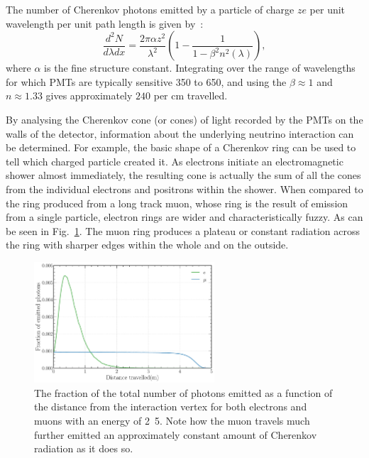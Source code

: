 The number of Cherenkov photons emitted by a particle of charge $ze$ per unit wavelength per unit
path length is given by~\cite{particle2020}:
\begin{equation}
    \frac{d^{2}N}{d\lambda dx}=\frac{2\pi\alpha z^{2}}{\lambda^{2}}
    \left(1-\frac{1}{1-\beta^{2}n^{2}(\lambda)}\right),
    \label{eq:cherenkov_emission}
\end{equation}
where $\alpha$ is the fine structure constant. Integrating over the range of wavelengths for which
PMTs are typically sensitive \unit{350}{} to \unit{650}{}, and using the
$\beta\approx 1$ and $n\approx1.33$ gives approximately $240$ per cm travelled.

By analysing the Cherenkov cone (or cones) of light recorded by the PMTs on the walls of the
detector, information about the underlying neutrino interaction can be determined. For example,
the basic shape of a Cherenkov ring can be used to tell which charged particle created it. As
electrons initiate an electromagnetic shower almost immediately, the resulting cone is actually
the sum of all the cones from the individual electrons and positrons within the shower. When
compared to the ring produced from a long track muon, whose ring is the result of emission from a
single particle, electron rings are wider and characteristically fuzzy. As can be seen in
Fig.~\ref{fig:emission distance}. The muon ring produces a plateau or constant radiation across
the ring with sharper edges within the whole and on the outside.

\begin{figure} %
    \includegraphics[width=0.6\textwidth]{diagrams/4-chips/emission_distance.pdf}
    \caption[Fraction of Cherenkov photons emitted as a function of distance.]
    {The fraction of the total number of photons emitted as a function of the distance from the
        interaction vertex for both electrons and muons with an energy of \unit{2.5}{\GeV}. Note
        how the muon travels much further emitted an approximately constant amount of Cherenkov
        radiation as it does so.}
    \label{fig:emission distance}
\end{figure}

